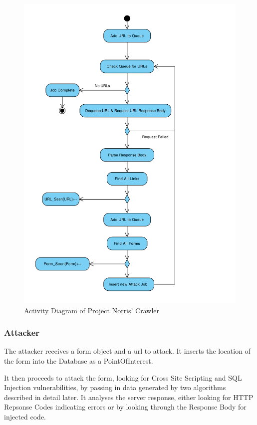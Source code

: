 \documentclass[12pt,a4paper]{article}
\begin{document}
\begin{figure}[!ht]
    \begin{center}
        \includegraphics[scale=0.7]{images/crawler_activity_diagram.pdf}    
    \end{center}
    \caption{Activity Diagram of Project Norris' Crawler}
    \label{fig:crawler}
\end{figure}


\subsubsection{Attacker}
The attacker receives a form object and a url to attack.  It inserts the location of the form into the Database as a PointOfInterest.  

It then proceeds to attack the form, looking for Cross Site Scripting and SQL Injection vulnerabilities, by passing in data generated by two algorithms described in detail later.  It analyses the server response, either looking for HTTP Repsonse Codes indicating errors or by looking through the Response Body for injected code.
\end{document}
